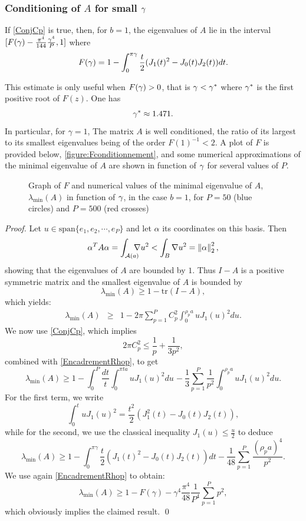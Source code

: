 \documentclass[smallextended]{svjour3}
\begin{document}
\subsubsection*{Conditioning of $A$ for small $\gamma$}
\begin{theorem} If \autoref{ConjCp} is true, then, for $b=1$, the eigenvalues of $A$ lie in the interval~ ${[F(\gamma) - \frac{\pi^4}{144}\frac{\gamma^4}{P},1]}$ where
	\[F(\gamma) = 1 - \int_{0}^{\pi \gamma} \frac{t}{2}(J_1(t)^2 - J_0(t)J_2(t) )dt.\]
	\label{The:lowBoundCon}
\end{theorem}
This estimate is only useful when ${F(\gamma) > 0}$, that is ${\gamma < \gamma^*}$ where $\gamma^*$ is the first positive root of $F(z)$. One has 
\[\gamma^* \approx 1.471.\]	
In particular, for $\gamma = 1$, The matrix $A$ is well conditioned, the ratio of its largest to its smallest eigenvalues being of the order $F(1)^{-1} < 2$.
A plot of $F$ is provided below, \autoref{figure:Fconditionnement}, and some numerical approximations of the minimal eigenvalue of $A$ are shown in function of $\gamma$ for several values of $P$. 		
\begin{figure}[h]
	\centering			
	
	\caption{Graph of $F$ and numerical values of the minimal eigenvalue of $A$, $\lambda_{\min}(A)$ in function of $\gamma$, in the case $b=1$, for $P=50$ (blue circles) and $P=500$ (red crosses)}
	\label{figure:Fconditionnement}
\end{figure}
\begin{proof}
	Let $u \in \text{span}\{e_1,e_2,\cdots,e_P\}$ and let $\alpha$ its coordinates on this basis. Then 
	\[\alpha^T A \alpha = \int_{\mathcal{A}(a)} \!\!\!\!\! \nabla{u}^2 < \int_{B} \nabla{u}^2 = \left\|\alpha\right\|_2^2,\]
	showing that the eigenvalues of $A$ are bounded by $1$. Thus $I-A$ is a positive symmetric matrix and the smallest eigenvalue of $A$ is bounded by
	\[\lambda_{\min}(A) \geq 1 - \text{tr}(I - A),\]
	which yields:
	\begin{eqnarray*}
		\lambda_{\min}(A) &\geq& 1 - 2\pi \sum_{p=1}^{P}C_p^2\int_{0}^{\rho_p a} u J_1(u)^2 du.
	\end{eqnarray*}
	We now use  \autoref{ConjCp}, which implies
	\[2\pi C_p^2 \leq \dfrac{1}{p} + \dfrac{1}{3p^2},\]
	combined with \eqref{EncadrementRhop}, to get
	\[\lambda_{\min}(A) \geq 1 - \int_{0}^{P} \frac{dt}{t} \int_{0}^{\pi t a} u J_1(u)^2du \hspace{1pt} - \frac{1}{3}\sum_{p=1}^P \frac{1}{p^2} \int_{0}^{\rho_p a} u J_1(u)^2du.\]
	For the first term, we write 
	\[\int_0^t u J_1(u)^2 = \frac{t^2}{2} \left(J_1^2(t) - J_0(t)J_2(t)\right),\] 
	while for the second, we use the classical inequality $J_1(u) \leq \frac{u}{2}$ to deduce
	\[\lambda_{\min}(A) \geq 1 - \int_{0}^{\pi\gamma} \dfrac{t}{2} \left(J_1(t)^2 - J_0(t)J_2(t)\right)dt - \frac{1}{48} \sum_{p=1}^P \frac{(\rho_p a)^4}{p^2}.\]
	We use again \eqref{EncadrementRhop} to obtain:
	\[\lambda_{\min}(A) \geq 1 - F(\gamma) - \gamma^4\frac{\pi^4}{48} \frac{1}{P^4} \sum_{p=1}^P p^2,\]
	which obviously implies the claimed result. 
	\qed
\end{proof}
\end{document}
